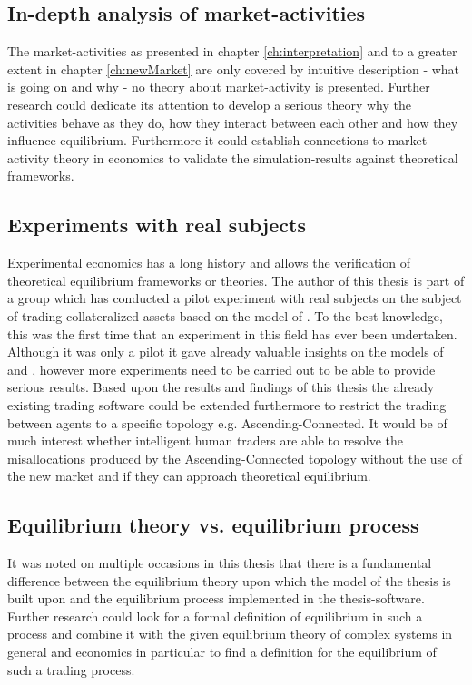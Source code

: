 \documentclass[Bachelorarbeit.tex]{subfiles}
\begin{document}
\subsection*{In-depth analysis of market-activities}
The market-activities as presented in chapter \ref{ch:interpretation} and to a greater extent in chapter \ref{ch:newMarket} are only covered by intuitive description - what is going on and why - no theory about market-activity is presented. Further research could dedicate its attention to develop a serious theory why the activities behave as they do, how they interact between each other and how they influence equilibrium. Furthermore it could establish connections to market-activity theory in economics to validate the simulation-results against theoretical frameworks.

\subsection*{Experiments with real subjects}
Experimental economics has a long history and allows the verification of theoretical equilibrium frameworks or theories. The author of this thesis is part of a group which has conducted a pilot experiment with real subjects on the subject of trading collateralized assets based on the model of \cite{Breuer2015}. To the best knowledge, this was the first time that an experiment in this field has ever been undertaken. Although it was only a pilot it gave already valuable insights on the models of \cite{Breuer2015} and \cite{Geanakoplos2009}, however more experiments need to be carried out to be able to provide serious results. Based upon the results and findings of this thesis the already existing trading software could be extended furthermore to restrict the trading between agents to a specific topology e.g. Ascending-Connected. It would be of much interest whether intelligent human traders are able to resolve the misallocations produced by the Ascending-Connected topology without the use of the new market and if they can approach theoretical equilibrium.

\subsection*{Equilibrium theory vs. equilibrium process}
It was noted on multiple occasions in this thesis that there is a fundamental difference between the equilibrium theory upon which the model of the thesis is built upon and the equilibrium process implemented in the thesis-software. Further research could look for a formal definition of equilibrium in such a process and combine it with the given equilibrium theory of complex systems in general and economics in particular to find a definition for the equilibrium of such a trading process.
\end{document}
